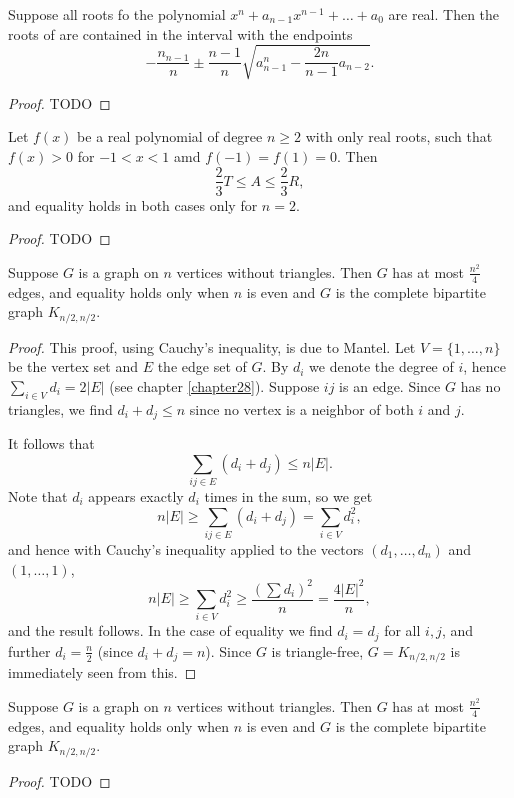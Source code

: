 \begin{theorem}
  \label{ch20theorem1}
  Suppose all roots fo the polynomial
  $x^n + a_{n - 1}x^{n - 1} + \dots +a_0$ are real.
  Then the roots of are contained in the interval with the endpoints
  \[
  -\frac{n_{n-1}}{n}\pm\frac{n - 1}{n}\sqrt{a^n_{n - 1} - \frac{2n}{n - 1}a_{n - 2}}.
  \]
\end{theorem}
\begin{proof}
  TODO
\end{proof}



\begin{theorem}
  \label{ch20theorem2} Let $f(x)$ be a real polynomial of degree $n \ge 2$ with only real
  roots, such that $f(x)> 0$ for $ -1 < x < 1$ amd $f(-1) = f(1) = 0$. Then
  \[
  \frac{2}{3}T \le A \le \frac{2}{3}R,
  \]
  and equality holds in both cases only for $n=2$.
\end{theorem}
\begin{proof}
  TODO
\end{proof}

\begin{theorem}
  \label{ch20theorem3proof1}
  Suppose $G$ is a graph on $n$ vertices without triangles. Then $G$
  has at most $\frac{n^2}{4}$ edges, and equality holds only when $n$ is even and $G$ is the
  complete bipartite graph $K_{n/2, n/2}$.
\end{theorem}
\begin{proof}
  This proof, using Cauchy's inequality, is due to Mantel.
  Let $V = \{1, \dots, n\}$ be the vertex set and $E$ the edge set of $G$.
  By $d_i$ we denote the degree of $i$, hence $\sum_{i \in V} d_i = 2|E|$
  (see chapter \ref{chapter28}). Suppose $ij$ is an edge.
  Since $G$ has no triangles, we find $d_i + d_j \leq n$ since no vertex is a
  neighbor of both $i$ and $j$.

  It follows that
  \[
  \sum_{ij \in E} (d_i + d_j) \leq n|E|.
  \]
  Note that $d_i$ appears exactly $d_i$ times in the sum, so we get
  \[
  n|E| \geq \sum_{ij \in E} (d_i + d_j) = \sum_{i \in V} d_i^2,
  \]
  and hence with Cauchy's inequality applied to the vectors $(d_1, \dots, d_n)$ and $(1, \dots, 1)$,
  \[
  n|E| \geq \sum_{i \in V} d_i^2 \geq \frac{\left( \sum d_i \right)^2}{n} = \frac{4|E|^2}{n},
  \]
  and the result follows. In the case of equality we find $d_i = d_j$ for all $i, j$, and further
  $d_i = \frac{n}{2}$ (since $d_i + d_j = n$). Since $G$ is triangle-free, $G = K_{n/2, n/2}$ is
  immediately seen from this.

\end{proof}

\begin{theorem}
  \label{ch20theorem3proof2}
  Suppose $G$ is a graph on $n$ vertices without triangles. Then $G$
  has at most $\frac{n^2}{4}$ edges, and equality holds only when $n$ is even and $G$ is the
  complete bipartite graph $K_{n/2, n/2}$.
\end{theorem}
\begin{proof}
  TODO
\end{proof}
